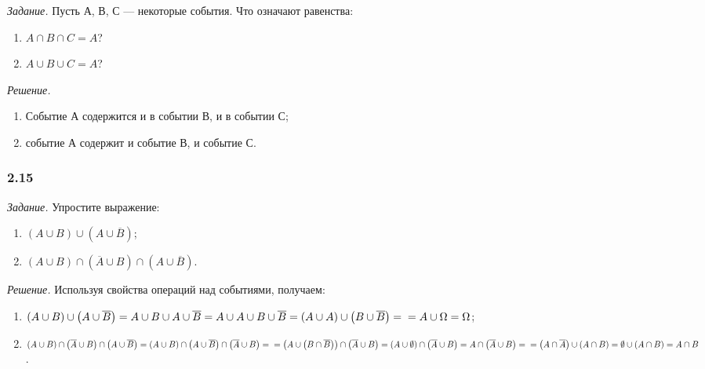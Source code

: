 \textit{Задание.} Пусть А, В, С --- некоторые события.
Что означают равенства:
\begin{enumerate}[label=\alph*)]
\item $ A \cap B \cap C = A $?
\item $ A \cup B \cup C = A $?
\end{enumerate}

\textit{Решение.}
\begin{enumerate}[label=\alph*)]
\item Событие А содержится и в событии В, и в событии С;

\item событие А содержит и событие В, и событие С.
\end{enumerate}

\subsubsection*{2.15}

\textit{Задание.} Упростите выражение:
\begin{enumerate}[label=\alph*)]
\item $ \left( A \cup B \right) \cup \left( A \cup \overline{ B } \right) $;
\item $ \left( A \cup B \right) \cap \left( \overline{ A } \cup B \right) \cap \left( A \cup \overline{ B } \right) $.
\end{enumerate}

\textit{Решение.} Используя свойства операций над событиями, получаем:
\begin{enumerate}[label=\alph*)]
\item $ \left( A \cup B \right) \cup \left( A \cup \overline{ B } \right) =
A \cup B \cup A \cup \overline{ B } =
A \cup A \cup B \cup \overline{ B } =
\left( A \cup A \right) \cup \left( B \cup \overline{ B } \right) = \\
= A \cup \Omega =
\Omega $;

\item $ \left( A \cup B \right) \cap \left( \overline{ A } \cup B \right) \cap \left( A \cup \overline{ B } \right) =
\left( A \cup B \right) \cap \left( A \cup \overline{ B } \right) \cap \left( \overline{ A } \cup B \right) = \\
= \left( A \cup \left( B \cap \overline{ B } \right) \right) \cap \left( \overline{ A } \cup B \right) =
\left( A \cup \emptyset \right) \cap \left( \overline{ A } \cup B \right) =
A \cap \left( \overline{ A } \cup B \right) = \\
= \left( A \cap \overline{ A } \right) \cup \left( A \cap B \right) =
\emptyset \cup \left( A \cap B \right) =
A \cap B $.
\end{enumerate}

